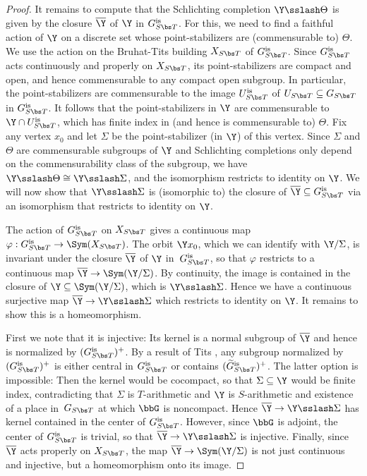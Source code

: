 \begin{proof}
It remains to compute that the Schlichting completion $\Y\sslash\Theta$ is given by the closure $\overline{\Y}$ of $\Y$ in $G_{S\bs T}^{\textup{is}}$. For this, we need to find a faithful action of $\Y$ on a discrete set whose point-stabilizers are (commensurable to) $\Theta$. We use the action on the Bruhat-Tits building $X_{S\bs T}$ of $G_{S\bs T}^{\textup{is}}$. Since $G_{S\bs T}^{\textup{is}}$ acts continuously and properly on $X_{S\bs T}$, its point-stabilizers are compact and open, and hence commensurable to any compact open subgroup. In particular, the point-stabilizers are commensurable to the image $U_{S\bs T}^{\textup{is}}$ of $U_{S\bs T}\subseteq G_{S\bs T}$ in $G_{S\bs T}^{\textup{is}}$. It follows that the point-stabilizers in $\Y$ are commensurable to $\Y\cap U_{S\bs T}^{\textup{is}}$, which has finite index in (and hence is commensurable to) $\Theta$. Fix any vertex $x_0$ and let $\Sigma$ be the point-stabilizer (in $\Y$) of this vertex. Since $\Sigma$ and $\Theta$ are commensurable subgroups of $\Y$ and Schlichting completions only depend on the commensurability class of the subgroup, we have $\Y\sslash\Theta\cong \Y\sslash\Sigma$, and the isomorphism restricts to identity on $\Y$. We will now show that $\Y\sslash\Sigma$ is (isomorphic to) the closure of $\overline{\Y}\subseteq G_{S\bs T}^{\textup{is}}$ via an isomorphism that restricts to identity on $\Y$.

The action of $G_{S\bs T}^{\textup{is}}$ on $X_{S\bs T}$ gives a continuous map $\varphi:G_{S\bs T}^{\textup{is}}\to \Sym(X_{S\bs T})$. The orbit $\Y x_0$, which we can identify with $\Y/\Sigma$, is invariant under the closure $\overline{\Y}$ of $\Y$ in~$G_{S\bs T}^{\textup{is}}$, so that $\varphi$ restricts to a continuous map $\overline{\Y}\to \Sym(\Y/\Sigma)$. By continuity, the image is contained in the closure of $\Y\subseteq\Sym(\Y/\Sigma)$, which is $\Y\sslash\Sigma$. Hence we have a continuous surjective map $\overline{\Y}\to\Y\sslash\Sigma$ which restricts to identity on $\Y$. It remains to show this is a homeomorphism.

First we note that it is injective: Its kernel is a normal subgroup of $\overline{\Y}$ and hence is normalized by $(G_{S\bs T}^{\textup{is}})^+$. By a result of Tits \cite{tits-simple}, any subgroup normalized by $(G_{S\bs T}^{\textup{is}})^+$ is either central in $G_{S\bs T}^{\textup{is}}$ or contains $(\widetilde{G}_{S\bs T}^{\textup{is}})^+$. The latter option is impossible: Then the kernel would be cocompact, so that $\Sigma\subseteq\Y$ would be finite index, contradicting that $\Sigma$ is $T$-arithmetic and $\Y$ is $S$-arithmetic and existence of a place in~$G_{S\bs T}$ at which $\bbG$ is noncompact. Hence $\overline{\Y}\to\Y\sslash\Sigma$ has kernel contained in the center of $G_{S\bs T}^{\textup{is}}$. However, since $\bbG$ is adjoint, the center of $G_{S\bs T}^{\textup{is}}$ is trivial, so that $\overline{\Y}\to\Y\sslash\Sigma$ is injective. Finally, since $\overline{\Y}$ acts properly on $X_{S\bs T}$, the map $\overline{\Y}\to \Sym(\Y / \Sigma)$ is not just continuous and injective, but a homeomorphism onto its image. \end{proof}

